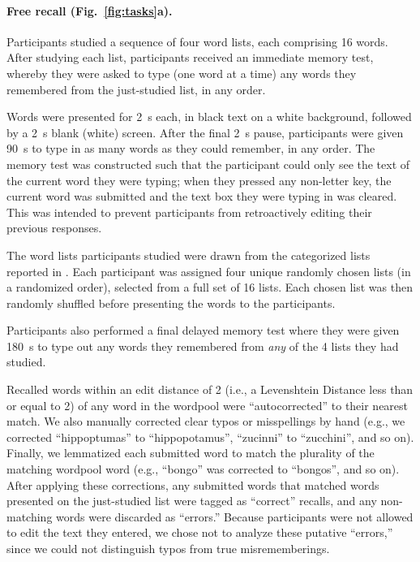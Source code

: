 \documentclass[10pt]{article}
\begin{document}
\paragraph*{Free recall (Fig.~\ref{fig:tasks}a).} 
Participants studied a sequence of four word lists, each comprising 16
words.  After studying each list, participants received an immediate
memory test, whereby they were asked to type (one word at a time) any
words they remembered from the just-studied list, in any order.

Words were presented for 2~s each, in black text on a white
background, followed by a 2~s blank (white) screen.  After the final
2~s pause, participants were given 90~s to type in as many words as
they could remember, in any order.  The memory test was constructed
such that the participant could only see the text of the current word
they were typing; when they pressed any non-letter key, the current
word was submitted and the text box they were typing in was cleared.
This was intended to prevent participants from retroactively editing
their previous responses.

The word lists participants studied were drawn from the categorized
lists reported in \cite{ZimaEtal18}.  Each participant was assigned
four unique randomly chosen lists (in a randomized order), selected
from a full set of 16 lists.  Each chosen list was then randomly
shuffled before presenting the words to the participants.

Participants also performed a final delayed memory test where they
were given 180~s to type out any words they remembered from
\textit{any} of the 4 lists they had studied.

Recalled words within an edit distance of 2 (i.e., a Levenshtein Distance less
than or equal to 2) of any word in the wordpool were ``autocorrected''
to their nearest match.  We also manually corrected clear typos or
misspellings by hand (e.g., we corrected ``hippoptumas'' to
``hippopotamus'', ``zucinni'' to ``zucchini'', and so on).  Finally,
we lemmatized each submitted word to match the plurality of the
matching wordpool word (e.g., ``bongo'' was corrected to ``bongos'',
and so on).  After applying these corrections, any submitted words
that matched words presented on the just-studied list were tagged as
``correct'' recalls, and any non-matching words were discarded as
``errors.''  Because participants were not allowed to edit the text
they entered, we chose not to analyze these putative ``errors,'' since
we could not distinguish typos from true misrememberings.
\end{document}
